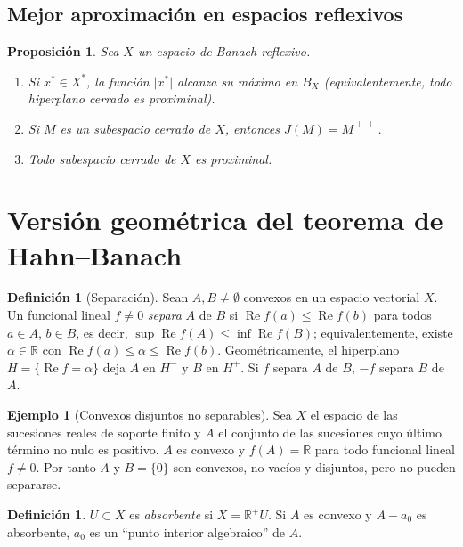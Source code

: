 \documentclass[11pt,a4paper]{article}
\newcommand{\R}{\mathbb{R}}
\newcommand{\abs}[1]{\lvert #1\rvert}
\renewcommand{\Re}{\operatorname{Re}}
\theoremstyle{plain}
\newtheorem{proposicion}[teorema]{Proposición}
\theoremstyle{definition}
\newtheorem{definicion}[teorema]{Definición}
\newtheorem{ejemplo}[teorema]{Ejemplo}
\theoremstyle{remark}
\begin{document}
\subsection{Mejor aproximación en espacios reflexivos}

\begin{proposicion}
Sea $X$ un espacio de Banach reflexivo.
\begin{enumerate}[label=(\alph*)]
\item Si $x^*\in X^*$, la función $\abs{x^*}$ alcanza su máximo en $B_X$ (equivalentemente, todo hiperplano cerrado es proximinal).
\item Si $M$ es un subespacio cerrado de $X$, entonces $J(M)=M^{\perp\perp}$.
\item Todo subespacio cerrado de $X$ es proximinal.
\end{enumerate}
\end{proposicion}

\section{Versión geométrica del teorema de Hahn--Banach}

\begin{definicion}[Separación]
Sean $A,B\neq\emptyset$ convexos en un espacio vectorial $X$. Un funcional lineal $f\neq0$ \emph{separa} $A$ de $B$ si
$\Re f(a)\le\Re f(b)$ para todos $a\in A$, $b\in B$, es decir, $\sup\Re f(A)\le\inf\Re f(B)$; equivalentemente, existe $\alpha\in\R$ con $\Re f(a)\le\alpha\le\Re f(b)$. Geométricamente, el hiperplano $H=\{\Re f=\alpha\}$ deja $A$ en $H^-$ y $B$ en $H^+$. Si $f$ separa $A$ de $B$, $-f$ separa $B$ de $A$.
\end{definicion}

\begin{ejemplo}[Convexos disjuntos no separables]
Sea $X$ el espacio de las sucesiones reales de soporte finito y $A$ el conjunto de las sucesiones cuyo último término no nulo es positivo. $A$ es convexo y $f(A)=\R$ para todo funcional lineal $f\neq0$. Por tanto $A$ y $B=\{0\}$ son convexos, no vacíos y disjuntos, pero no pueden separarse.
\end{ejemplo}

\begin{definicion}
$U\subset X$ es \emph{absorbente} si $X=\R^+U$. Si $A$ es convexo y $A-a_0$ es absorbente, $a_0$ es un ``punto interior algebraico'' de $A$.
\end{definicion}
\end{document}
